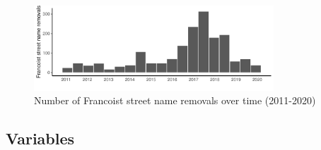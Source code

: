 \documentclass[12pt, titlepage]{article}
\begin{document}
\begin{figure}[htb!]
\centering

  \includegraphics[width = 0.8\textwidth]{img/changes_by_year}

  \caption{Number of Francoist street name removals over time (2011-2020)}\label{fig:changes_time}

  \vspace{5pt}


\end{figure}



\subsection*{Variables}
\end{document}
